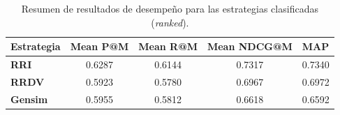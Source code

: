 \begin{table}[H]
\centering
\label{tab:rankedResults}
\begin{tabular}{|l|c|c|c|c|}
\hline
\textbf{Estrategia} & \multicolumn{1}{l|}{\textbf{Mean P@M}} & \multicolumn{1}{l|}{\textbf{Mean R@M}} & \multicolumn{1}{l|}{\textbf{Mean NDCG@M}} & \multicolumn{1}{l|}{\textbf{MAP}} \\ \hline
\textbf{RRI} & 0.6287 & 0.6144 & 0.7317 & 0.7340 \\ \hline
\textbf{RRDV} & 0.5923 & 0.5780 & 0.6967 & 0.6972 \\ \hline
\textbf{Gensim} & 0.5955 & 0.5812 & 0.6618 & 0.6592 \\ \hline
\end{tabular}
\caption{Resumen de resultados de desempeño para las estrategias clasificadas (\textit{ranked}).}
\end{table}


